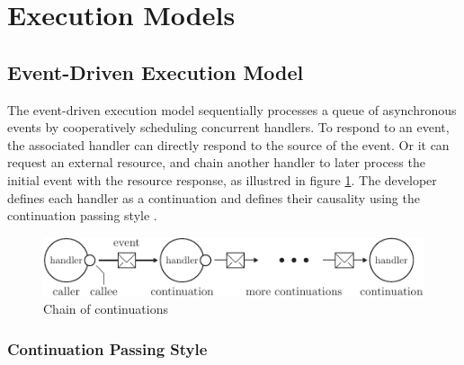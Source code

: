 \section{Execution Models} \label{chapter4:execution-models}

\subsection{Event-Driven Execution Model} \label{chapter4:event-driven}

The event-driven execution model sequentially processes a queue of asynchronous events by cooperatively scheduling concurrent handlers.
To respond to an event, the associated handler can directly respond to the source of the event.
Or it can request an external resource, and chain another handler to later process the initial event with the resource response, as illustred in figure \ref{fig:cont-chain}.
The developer defines each handler as a continuation and defines their causality using the continuation passing style \cite{Wand1980,Haynes1984}.

\begin{figure}[h!]
  \centering
  \includegraphics[width=\linewidth]{../resources/cont-chain.pdf}
  \caption{Chain of continuations}
  \label{fig:cont-chain}
\end{figure}

\subsubsection{Continuation Passing Style} \label{chapter4:event-loop:continuation}



